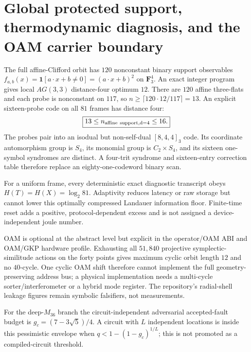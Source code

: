 \section{Global protected support, thermodynamic diagnosis, and the OAM carrier boundary}
\label{sec:bt2937-bt2945}

The full affine-Clifford orbit has $120$ nonconstant binary support observables
$f_{a,b}(x)=\mathbf 1[a\cdot x+b\ne0]=(a\cdot x+b)^2$ on $\mathbf F_3^4$.
An exact integer program gives local $AG(3,3)$ distance-four optimum $12$.
There are $120$ affine three-flats and each probe is nonconstant on $117$, so
$n\ge\lceil120\cdot12/117\rceil=13$. An explicit sixteen-probe code on all
$81$ frames has distance four:
\[
\boxed{13\le n_{\rm affine\ support,d=4}\le16.}
\]
The probes pair into an isodual but non-self-dual $[8,4,4]_3$ code. Its coordinate
automorphism group is $S_4$, its monomial group is $C_2\times S_4$, and its sixteen
one-symbol syndromes are distinct. A four-trit syndrome and sixteen-entry correction
table therefore replace an eighty-one-codeword binary scan.

For a uniform frame, every deterministic exact diagnostic transcript obeys
$H(T)=H(X)=\log_2 81$. Adaptivity reduces latency or raw storage but cannot lower this
optimally compressed Landauer information floor. Finite-time reset adds a positive,
protocol-dependent excess and is not assigned a device-independent joule number.

OAM is optional at the abstract level but explicit in the operator/OAM ABI and OAM/GKP
hardware profile. Exhausting all $51{,}840$ projective symplectic-similitude actions on
the forty points gives maximum cyclic orbit length $12$ and no $40$-cycle. One cyclic OAM
shift therefore cannot implement the full geometry-preserving address bus; a physical
implementation needs a multi-cycle sorter/interferometer or a hybrid mode register. The
repository's radial-shell leakage figures remain symbolic falsifiers, not measurements.

For the deep-$M_{36}$ branch the circuit-independent adversarial accepted-fault budget is
$g_c=(7-3\sqrt5)/4$. A circuit with $L$ independent locations is inside this pessimistic
envelope when $q<1-(1-g_c)^{1/L}$; this is not promoted as a compiled-circuit threshold.
